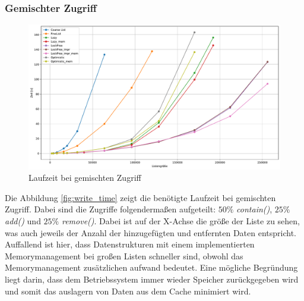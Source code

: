 \subsubsection{Gemischter Zugriff}
\begin{figure}[ht!]
	\centering
	\includegraphics[width=1.0\linewidth]{./plots_pdf/mixed_time} 
	\caption{Laufzeit bei gemischten Zugriff}
	\label{fig:mixed_time} 
\end{figure}
Die Abbildung \ref{fig:write_time} zeigt die benötigte Laufzeit bei gemischten Zugriff. Dabei sind die Zugriffe folgendermaßen aufgeteilt:
 $50\%$ \textit{contain()}, $25\%$ \textit{add()} und $25\%$ \textit{remove()}.
 Dabei ist auf der X-Achse die größe der Liste zu sehen, was auch jeweils der Anzahl der hinzugefügten und entfernten Daten entspricht. 
 Auffallend ist hier, dass Datenstrukturen mit einem implementierten Memorymanagement bei großen Listen schneller sind, obwohl
 das Memorymanagement zusätzlichen aufwand bedeutet. Eine mögliche Begründung liegt darin, dass dem Betriebssystem immer wieder 
 Speicher zurückgegeben wird und somit das auslagern von Daten aus dem Cache minimiert wird.

